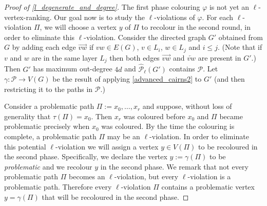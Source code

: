 \documentclass{patmorin}
\newcommand{\defin}[1]{\emph{\color{brightmaroon}#1}}
\begin{document}
\begin{proof}[Proof of \cref{l_degenerate_and_degree}]
  The first phase colouring $\varphi$ is not yet an $\ell$-vertex-ranking.  Our goal now is to study the $\ell$-violations of $\varphi$.  For each $\ell$-violation $\Pi$, we will choose a vertex $y$ of $\Pi$ to recolour in the second round, in order to eliminate this $\ell$-violation.  Consider the directed graph $G'$ obtained from $G$ by adding each edge $\overrightarrow{vw}$ if $vw\in E(G)$, $v\in L_i$, $w\in L_j$ and $i\le j$.  (Note that if $v$ and $w$ are in the same layer $L_j$ then both edges $\overrightarrow{vw}$ and $\overleftarrow{vw}$ are present in $G'$.)  Then $G'$ has maximum out-degree $4d$ and $\widehat{\mathcal{P}}_\ell(G')$ contains $\mathcal{P}$. Let $\gamma:\mathcal{P}\to V(G)$ be the result of applying \cref{advanced_cairns2} to $G'$ (and then restricting it to the paths in $\mathcal{P}$.)

  Consider a problematic path $\Pi:=x_0,\ldots,x_r$ and suppose, without loss of generality that $\tau(\Pi)=x_0$.  Then $x_r$ was coloured before $x_0$ and $\Pi$ became problematic precisely when $x_0$ was coloured.
  By the time the colouring is complete, a problematic path $\Pi$ may be an $\ell$-violation.  In order to eliminate this potential $\ell$-violation we will assign a vertex $y\in V(\Pi)$ to be recoloured in the second phase.  Specifically, we declare the vertex $y:=\gamma(\Pi)$ to be \defin{problematic} and we recolour $y$ in the second phase.  We remark that not every problematic path $\Pi$ becomes an $\ell$-violation, but every $\ell$-violation is a problematic path.  Therefore every $\ell$-violation $\Pi$ contains a problematic vertex $y=\gamma(\Pi)$ that will be recoloured in the second phase.



\end{proof}
\end{document}
